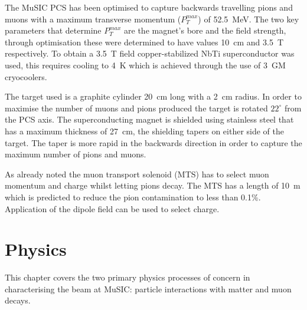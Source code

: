 The MuSIC PCS has been optimised to capture backwards travelling pions and muons with a maximum transverse momentum (\(P_{T}^{max}\)) of 52.5~MeV. The two key parameters that determine \(P_{T}^{max}\) are the magnet's bore and the field strength, through optimisation these were determined to have values 10~cm and 3.5~T respectively. To obtain a 3.5~T field copper-stabilized NbTi superconductor was used, this requires cooling to 4~K which is achieved through the use of 3~GM cryocoolers. 

The target used is a graphite cylinder 20~cm long with a 2~cm radius. In order to maximise the number of muons and pions produced the target is rotated \(22^{\circ}\) from the PCS axis. The superconducting magnet is shielded using stainless steel that has a maximum thickness of 27~cm, the shielding tapers on either side of the target. The taper is more rapid in the backwards direction in order to capture the maximum number of pions and muons.  

As already noted the muon transport solenoid (MTS) has to select muon momentum and charge whilst letting pions decay. The MTS has a length of 10~m which is predicted to reduce the pion contamination to less than 0.1\%. Application of the dipole field can be used to select charge.

\chapter{Physics} %
\label{cha:physics}
This chapter covers the two primary physics processes of concern in characterising the beam at MuSIC: particle interactions with matter and muon decays. 
